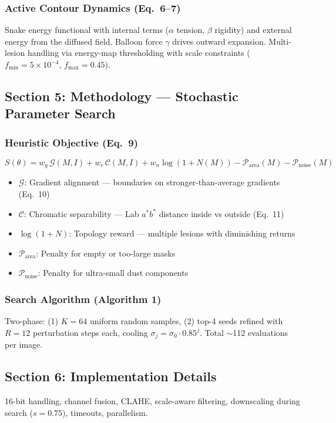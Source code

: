 \documentclass[11pt,a4paper]{article}
\begin{document}
\subsubsection{Active Contour Dynamics (Eq.~6--7)}
Snake energy functional with internal terms ($\alpha$ tension, $\beta$ rigidity) and external energy from the diffused field.  Balloon force $\gamma$ drives outward expansion.  Multi-lesion handling via energy-map thresholding with scale constraints ($f_{\min} = 5\times10^{-4}$, $f_{\max} = 0.45$).

\subsection{Section 5: Methodology --- Stochastic Parameter Search}

\subsubsection{Heuristic Objective (Eq.~9)}
\[
S(\theta) = w_g \,\mathcal{G}(M,I) + w_c \,\mathcal{C}(M,I) + w_n \log(1+N(M)) - \mathcal{P}_{\mathrm{area}}(M) - \mathcal{P}_{\mathrm{noise}}(M)
\]
\begin{itemize}[nosep]
  \item $\mathcal{G}$: Gradient alignment --- boundaries on stronger-than-average gradients (Eq.~10)
  \item $\mathcal{C}$: Chromatic separability --- Lab $a^*b^*$ distance inside vs outside (Eq.~11)
  \item $\log(1+N)$: Topology reward --- multiple lesions with diminishing returns
  \item $\mathcal{P}_{\mathrm{area}}$: Penalty for empty or too-large masks
  \item $\mathcal{P}_{\mathrm{noise}}$: Penalty for ultra-small dust components
\end{itemize}

\subsubsection{Search Algorithm (Algorithm 1)}
Two-phase: (1) $K=64$ uniform random samples, (2) top-4 seeds refined with $R=12$ perturbation steps each, cooling $\sigma_j = \sigma_0 \cdot 0.85^j$.  Total $\sim$112 evaluations per image.

\subsection{Section 6: Implementation Details}
16-bit handling, channel fusion, CLAHE, scale-aware filtering, downscaling during search ($s=0.75$), timeouts, parallelism.
\end{document}

